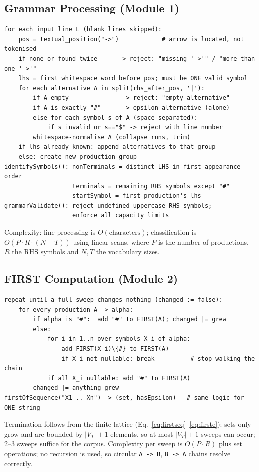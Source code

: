 \documentclass[12pt,a4paper,oneside,openany]{report}
\newcommand{\code}[1]{\texttt{#1}}
\begin{document}
\subsection{Grammar Processing (Module 1)}
\begin{lstlisting}[style=cfg,label=lst:grammar,caption={Grammar load and validation (abridged)}]
for each input line L (blank lines skipped):
    pos = textual_position("->")            # arrow is located, not tokenised
    if none or found twice      -> reject: "missing '->'" / "more than one '->'"
    lhs = first whitespace word before pos; must be ONE valid symbol
    for each alternative A in split(rhs_after_pos, '|'):
        if A empty               -> reject: "empty alternative"
        if A is exactly "#"      -> epsilon alternative (alone)
        else for each symbol s of A (space-separated):
            if s invalid or s=="$" -> reject with line number
        whitespace-normalise A (collapse runs, trim)
    if lhs already known: append alternatives to that group
    else: create new production group
identifySymbols(): nonTerminals = distinct LHS in first-appearance order
                   terminals = remaining RHS symbols except "#"
                   startSymbol = first production's lhs
grammarValidate(): reject undefined uppercase RHS symbols;
                   enforce all capacity limits
\end{lstlisting}

Complexity: line processing is $O(\text{characters})$;
classification is $O(P\cdot R\cdot(N+T))$ using linear scans, where
$P$ is the number of productions, $R$ the RHS symbols and $N,T$ the
vocabulary sizes.

\subsection{FIRST Computation (Module 2)}
\begin{lstlisting}[style=cfg,label=lst:first,caption={FIRST fixed-point algorithm (abridged)}]
repeat until a full sweep changes nothing (changed := false):
    for every production A -> alpha:
        if alpha is "#":  add "#" to FIRST(A); changed |= grew
        else:
            for i in 1..n over symbols X_i of alpha:
                add FIRST(X_i)\{#} to FIRST(A)
                if X_i not nullable: break          # stop walking the chain
            if all X_i nullable: add "#" to FIRST(A)
        changed |= anything grew
firstOfSequence("X1 .. Xn") -> (set, hasEpsilon)   # same logic for ONE string
\end{lstlisting}
Termination follows from the finite lattice
(Eq.~\eqref{eq:firstseq}--\eqref{eq:firste}): sets only grow and are
bounded by $|V_T|{+}1$ elements, so at most $|V_T|{+}1$ sweeps can occur;
2--3 sweeps suffice for the corpus. Complexity per sweep is
$O(P\cdot R)$ plus set operations; no recursion is used, so circular
\code{A -> B}, \code{B -> A} chains resolve correctly.
\end{document}
